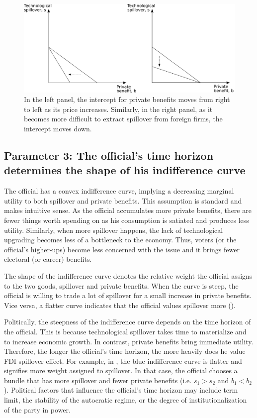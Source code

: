 \begin{figure}[!ht]
	\centering
    \includegraphics[width=\textwidth, height=\textheight,keepaspectratio]{../figure/absorptive_capacity}
    \caption{In the left panel, the intercept for private benefits moves from right to left as its price increases. Similarly, in the right panel, as it becomes more difficult to extract spillover from foreign firms, the intercept moves down.}
    \label{fig:relative_price}
\end{figure}

\subsection{Parameter 3: The official's time horizon determines the shape of his indifference curve}
\label{sec:theory_indifference_curve}

The official has a convex indifference curve, implying a decreasing marginal utility to both spillover and private benefits. This assumption is standard and makes intuitive sense. As the official accumulates more private benefits, there are fewer things worth spending on as his consumption is satiated and produces less utility. Similarly, when more spillover happens, the lack of technological upgrading becomes less of a bottleneck to the economy. Thus, voters (or the official's higher-ups) become less concerned with the issue and it brings fewer electoral (or career) benefits.

The shape of the indifference curve denotes the relative weight the official assigns to the two goods, spillover and private benefits. When the curve is steep, the official is willing to trade a lot of spillover for a small increase in private benefits. Vice versa, a flatter curve indicates that the official values spillover more ().

Politically, the steepness of the indifference curve depends on the time horizon of the official. This is because technological spillover takes time to materialize and to increase economic growth. In contrast, private benefits bring immediate utility. Therefore, the longer the official's time horizon, the more heavily does he value FDI spillover effect. For example, in , the blue indifference curve is flatter and signifies more weight assigned to spillover. In that case, the official chooses a bundle that has more spillover and fewer private benefits (i.e. $s_1 > s_2$ and $b_1 < b_2$). Political factors that influence the official's time horizon may include term limit, the stability of the autocratic regime, or the degree of institutionalization of the party in power. 

